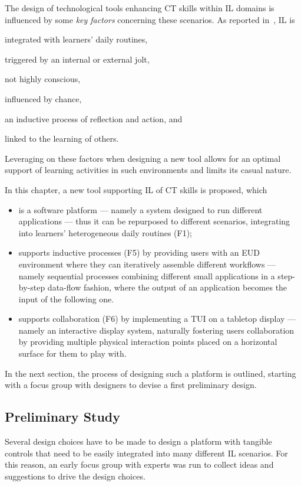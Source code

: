 The design of technological tools enhancing \ac{CT} skills within \ac{IL} domains is influenced by some \emph{key factors} concerning these scenarios. As reported in~\cite{doi:10.1177/152342239900100302}, \ac{IL} is
\begin{enumerate*}[label=(F\arabic*)]
  \item integrated with learners' daily routines,
  \item triggered by an internal or external jolt,
  \item not highly conscious,
  \item influenced by chance,
  \item an inductive process of reflection and action, and
  \item linked to the learning of others.
\end{enumerate*}
Leveraging on these factors when designing a new tool allows for an optimal support of learning activities in such environments and limits its casual nature.

In this chapter, a new tool supporting \ac{IL} of \ac{CT} skills is proposed, which
\begin{itemize}
  \item is a software platform --- namely a system designed to run different applications --- thus it can be repurposed to different scenarios, integrating into learners' heterogeneous daily routines (F1);
  \item supports inductive processes (F5) by providing users with an \ac{EUD} environment where they can iteratively assemble different workflows --- namely sequential processes combining different small applications in a step-by-step data-flow fashion, where the output of an application becomes the input of the following one.
  \item supports collaboration (F6) by implementing a \ac{TUI} on a tabletop display --- namely an interactive display system, naturally fostering users collaboration by providing multiple physical interaction points placed on a horizontal surface for them to play with.
\end{itemize}

In the next section, the process of designing such a platform is outlined, starting with a focus group with designers to devise a first preliminary design.

\subsection{Preliminary Study}\label{sec:pstudy}
Several design choices have to be made to design a platform with tangible controls that need to be easily integrated into many different \ac{IL} scenarios. For this reason, an early focus group with experts was run to collect ideas and suggestions to drive the design choices.

